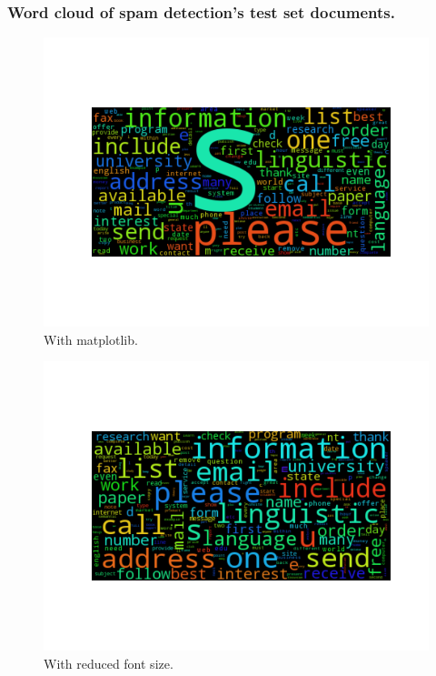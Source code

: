 \subsubsection{Word cloud of spam detection's test set documents.}
\begin{figure}[H]
  \centering
  \includegraphics[width=1\textwidth]{graphics/spam_matplotlib.png}
  \caption{With matplotlib.}
\end{figure}
\begin{figure}[H]
  \centering
  \includegraphics[width=1\textwidth]{graphics/spam_reduced.png}
  \caption{With reduced font size.}
\end{figure}

